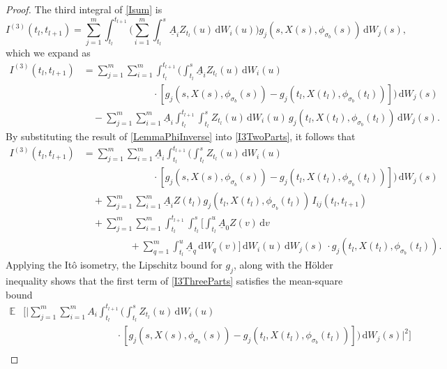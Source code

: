 \documentclass[onefignum]{siamart250211}
\begin{document}
\begin{proof}
The third integral of \cref{Isum} is
\begin{equation*}
I^{(3)}(t_l,t_{l+1})=\sum_{j=1}^m\int_{t_l}^{t_{l+1}}\bigg(\sum_{i=1}^m\int_{t_l}^s\underline{A}_iZ_{t_l}(u)\,\mathrm{d}W_i(u)\bigg)g_j(s,X(s),\phi_{\sigma_b}(s))\,\mathrm{d}W_j(s),
\end{equation*}
which we expand as
\begin{align}
I^{(3)}(t_l,t_{l+1})&=\sum_{j=1}^m\sum_{i=1}^m\int_{t_l}^{t_{l+1}}\bigg(\int_{t_l}^s\underline{A}_iZ_{t_l}(u)\,\mathrm{d}W_i(u)\,\nonumber\\
&\hspace{3cm}\cdot[g_j(s,X(s),\phi_{\sigma_b}(s))-g_j(t_l,X(t_l),\phi_{\sigma_b}(t_l))]\bigg)\,\mathrm{d}W_j(s)\nonumber\\
&\quad-\sum_{j=1}^m\sum_{i=1}^m\underline{A}_i\int_{t_l}^{t_{l+1}}\int_{t_l}^sZ_{t_l}(u)\,\mathrm{d}W_i(u)\,g_j(t_l,X(t_l),\phi_{\sigma_b}(t_l))\,\mathrm{d}W_j(s).\label{I3TwoParts}
\end{align}
By substituting the result of \cref{LemmaPhiInverse} into \cref{I3TwoParts}, it follows that
\begin{align}
I^{(3)}(t_l,t_{l+1})&=\sum_{j=1}^m\sum_{i=1}^m\underline{A}_i\int_{t_l}^{t_{l+1}}\bigg(\int_{t_l}^sZ_{t_l}(u)\,\mathrm{d}W_i(u)\,\nonumber\\
&\hspace{3cm}\cdot[g_j(s,X(s),\phi_{\sigma_b}(s))-g_j(t_l,X(t_l),\phi_{\sigma_b}(t_l))]\bigg)\,\mathrm{d}W_j(s)\nonumber\\
&\quad+\sum_{j=1}^m\sum_{i=1}^m\underline{A}_iZ(t_l)g_j(t_l,X(t_l),\phi_{\sigma_b}(t_l))\,I_{ij}(t_l,t_{l+1})\label{I3ThreeParts}\\
&\quad+\sum_{j=1}^m\sum_{i=1}^m\int_{t_l}^{t_{l+1}}\int_{t_l}^s\bigg[\int_{t_l}^u\underline{A}_0Z(v)\,\mathrm{d}v\nonumber\\
&\hspace{2cm}+\sum_{q=1}^m\int_{t_l}^u\underline{A}_q\,\mathrm{d}W_q(v)\bigg]\,\mathrm{d}W_i(u)\,\mathrm{d}W_j(s)\,\cdot g_j(t_l,X(t_l),\phi_{\sigma_b}(t_l)).\nonumber
\end{align}
Applying the It\^o isometry, the Lipschitz bound for $g_j$, along with the H\"older inequality shows that the first term of \cref{I3ThreeParts} satisfies the mean-square bound
\begin{align*}
\mathbb{E}&\bigg[\bigg|\sum_{j=1}^m\sum_{i=1}^mA_i\int_{t_l}^{t_{l+1}}\bigg(\int_{t_l}^sZ_{t_l}(u)\,\mathrm{d}W_i(u)\,\\
&\hspace{4cm}\cdot[g_j(s,X(s),\phi_{\sigma_b}(s))-g_j(t_l,X(t_l),\phi_{\sigma_b}(t_l))]\bigg)\,\mathrm{d}W_j(s)\bigg|^2\bigg]\\

\end{align*}
\end{proof}
\end{document}
